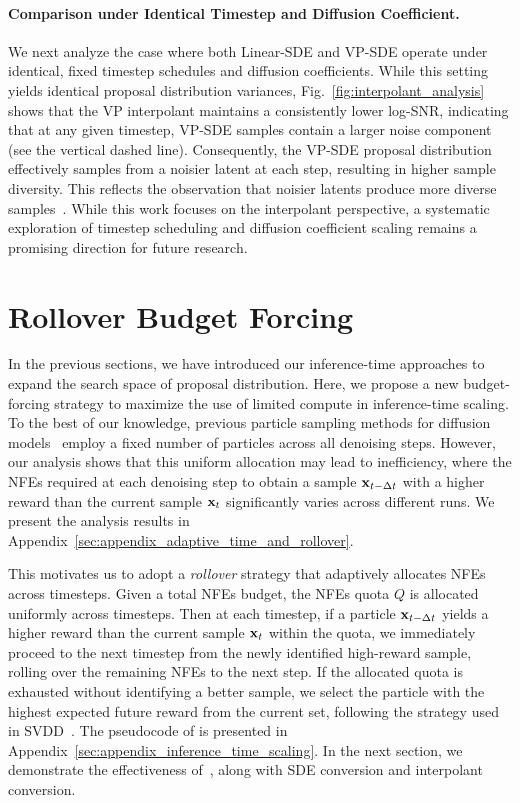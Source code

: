 \paragraph{Comparison under Identical Timestep and Diffusion Coefficient.}
We next analyze the case where both Linear-SDE and VP-SDE operate under identical, fixed timestep schedules and diffusion coefficients. 
% 
While this setting yields identical proposal distribution variances, Fig.~\ref{fig:interpolant_analysis} shows that the VP interpolant maintains a consistently lower log-SNR, indicating that at any given timestep, VP-SDE samples contain a larger noise component (see the vertical dashed line). 
% 
Consequently, the VP-SDE proposal distribution effectively samples from a noisier latent at each step, resulting in higher sample diversity. 
% 
This reflects the observation that noisier latents produce more diverse samples~\cite{meng2021sdedit}. 
% 
While this work focuses on the interpolant perspective, a systematic exploration of timestep scheduling and diffusion coefficient scaling remains a promising direction for future research. 


\vspace{-0.75\baselineskip}
\section{Rollover Budget Forcing}
\vspace{-0.5\baselineskip}
\label{sec:roll_over}
In the previous sections, we have introduced our inference-time approaches to expand the search space of proposal distribution. Here, we propose a new budget-forcing strategy to maximize the use of limited compute in inference-time scaling. 
To the best of our knowledge, previous particle sampling methods for diffusion models~\cite{Li2024:SVDD, Singh:2025CoDE} employ a fixed number of particles across all denoising steps. 
However, our analysis shows that this uniform allocation may lead to inefficiency, where the NFEs required at each denoising step to obtain a sample $\mathbf{x}_{t-\Delta t}$ with a higher reward than the current sample $\mathbf{x}_t$ significantly varies across different runs. We present the analysis results in Appendix~\ref{sec:appendix_adaptive_time_and_rollover}. 


This motivates us to adopt a \emph{rollover} strategy that adaptively allocates NFEs across timesteps. 
Given a total NFEs budget, the NFEs quota $Q$ is allocated uniformly across timesteps. 
Then at each timestep, if a particle $\mathbf{x}_{t-\Delta t}$ yields a higher reward than the current sample $\mathbf{x}_t$ within the quota, we immediately proceed to the next timestep from the newly identified high-reward sample, rolling over the remaining NFEs to the next step. 
If the allocated quota is exhausted without identifying a better sample, we select the particle with the highest expected future reward from the current set, following the strategy used in SVDD~\cite{Li2024:SVDD}.
The pseudocode of \Ours{} is presented in Appendix~\ref{sec:appendix_inference_time_scaling}. 
In the next section, we demonstrate the effectiveness of~\Ours{}, along with SDE conversion and interpolant conversion. 

